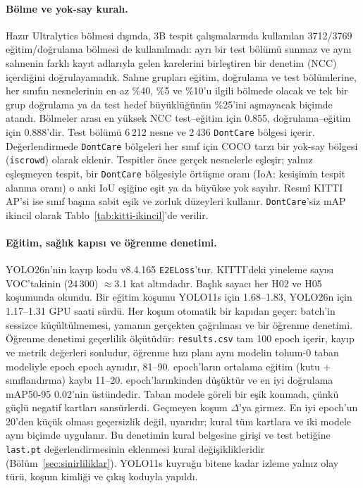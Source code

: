 \paragraph{Bölme ve yok-say kuralı.}
Hazır Ultralytics bölmesi dışında, 3B tespit çalışmalarında kullanılan 3712/3769 eğitim/doğrulama bölmesi de kullanılmadı: ayrı bir test bölümü sunmaz ve aynı sahnenin farklı kayıt adlarıyla gelen karelerini birleştiren bir denetim (NCC) içerdiğini doğrulayamadık. Sahne grupları eğitim, doğrulama ve test bölümlerine, her sınıfın nesnelerinin en az \%40, \%5 ve \%10'u ilgili bölmede olacak ve tek bir grup doğrulama ya da test hedef büyüklüğünün \%25'ini aşmayacak biçimde atandı. Bölmeler arası en yüksek NCC test--eğitim için 0.855, doğrulama--eğitim için 0.888'dir. Test bölümü 6\,212 nesne ve 2\,436 \texttt{DontCare} bölgesi içerir. Değerlendirmede \texttt{DontCare} bölgeleri her sınıf için COCO tarzı bir yok-say bölgesi (\texttt{iscrowd}) olarak eklenir. Tespitler önce gerçek nesnelerle eşleşir; yalnız eşleşmeyen tespit, bir \texttt{DontCare} bölgesiyle örtüşme oranı (IoA: kesişimin tespit alanına oranı) o anki IoU eşiğine eşit ya da büyükse yok sayılır. Resmî KITTI AP'si ise sınıf başına sabit eşik ve zorluk düzeyleri kullanır. \texttt{DontCare}'siz mAP ikincil olarak Tablo~\ref{tab:kitti-ikincil}'de verilir.

\paragraph{Eğitim, sağlık kapısı ve öğrenme denetimi.}
YOLO26n'nin kayıp kodu v8.4.165 \texttt{E2ELoss}'tur. KITTI'deki yineleme sayısı VOC'takinin (24\,300) $\approx$3.1 kat altındadır. Başlık sayacı her H02 ve H05 koşumunda okundu. Bir eğitim koşumu YOLO11s için 1.68--1.83, YOLO26n için 1.17--1.31 GPU saati sürdü. Her koşum otomatik bir kapıdan geçer: batch'in sessizce küçültülmemesi, yamanın gerçekten çağrılması ve bir öğrenme denetimi. Öğrenme denetimi geçerlilik ölçütüdür: \texttt{results.csv} tam 100 epoch içerir, kayıp ve metrik değerleri sonludur, öğrenme hızı planı aynı modelin tohum-0 taban modeliyle epoch epoch aynıdır, 81--90. epoch'ların ortalama eğitim (kutu $+$ sınıflandırma) kaybı 11--20. epoch'larınkinden düşüktür ve en iyi doğrulama mAP50-95 0.02'nin üstündedir. Taban modele göreli bir eşik konmadı, çünkü güçlü negatif kartları sansürlerdi. Geçmeyen koşum $\Delta$'ya girmez. En iyi epoch'un 20'den küçük olması geçersizlik değil, uyarıdır; kural tüm kartlara ve iki modele aynı biçimde uygulanır. Bu denetimin kural belgesine girişi ve test betiğine \texttt{last.pt} değerlendirmesinin eklenmesi kural değişiklikleridir (Bölüm~\ref{sec:sinirliliklar}). YOLO11s kuyruğu bitene kadar izleme yalnız olay türü, koşum kimliği ve çıkış koduyla yapıldı.

